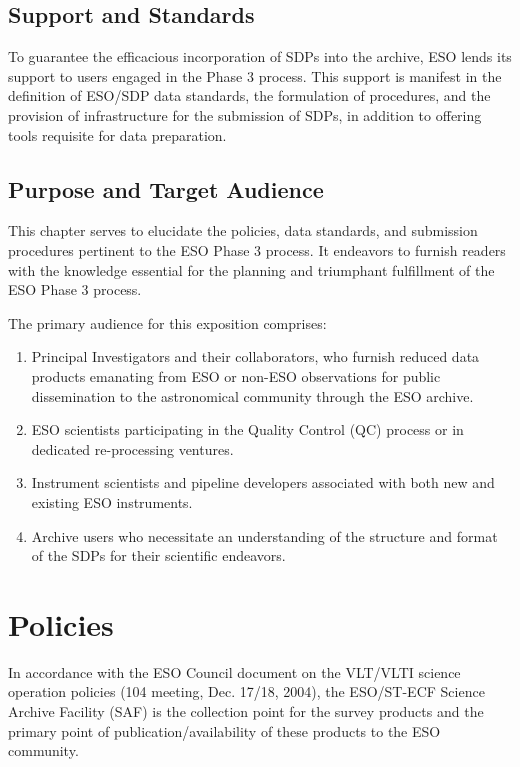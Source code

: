 \documentclass[a4paper,10pt]{book}
\begin{document}
\section{Support and Standards}

To guarantee the efficacious incorporation of SDPs into the archive, ESO lends its support to users engaged in the Phase 3 process. This support is manifest in the definition of ESO/SDP data standards, the formulation of procedures, and the provision of infrastructure for the submission of SDPs, in addition to offering tools requisite for data preparation.

\section{Purpose and Target Audience}

This chapter serves to elucidate the policies, data standards, and submission procedures pertinent to the ESO Phase 3 process. It endeavors to furnish readers with the knowledge essential for the planning and triumphant fulfillment of the ESO Phase 3 process.

The primary audience for this exposition comprises:

\begin{enumerate}
    \item Principal Investigators and their collaborators, who furnish reduced data products emanating from ESO or non-ESO observations for public dissemination to the astronomical community through the ESO archive.
    \item ESO scientists participating in the Quality Control (QC) process or in dedicated re-processing ventures.
    \item Instrument scientists and pipeline developers associated with both new and existing ESO instruments.
    \item Archive users who necessitate an understanding of the structure and format of the SDPs for their scientific endeavors.
\end{enumerate}


\chapter{Policies}
In accordance with the ESO Council document on the VLT/VLTI science operation policies (104 meeting, Dec. 17/18, 2004), the ESO/ST-ECF Science Archive Facility (SAF) is the collection point for the survey products and the primary point of publication/availability of these products to the ESO community.
\end{document}

